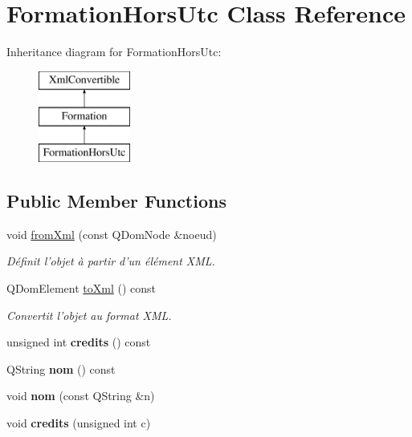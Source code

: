 \hypertarget{classFormationHorsUtc}{\section{Formation\+Hors\+Utc Class Reference}
\label{classFormationHorsUtc}
}
Inheritance diagram for Formation\+Hors\+Utc\+:\begin{figure}[H]
\begin{center}
\leavevmode
\includegraphics[height=3.000000cm]{classFormationHorsUtc}
\end{center}
\end{figure}
\subsection*{Public Member Functions}
\begin{DoxyCompactItemize}
\item 
\hypertarget{classFormationHorsUtc_a26f00d5dba28d91d3ea440cf3440bbaf}{void \hyperlink{classFormationHorsUtc_a26f00d5dba28d91d3ea440cf3440bbaf}{from\+Xml} (const Q\+Dom\+Node \&noeud)}\label{classFormationHorsUtc_a26f00d5dba28d91d3ea440cf3440bbaf}

\begin{DoxyCompactList}\small\item\em Définit l'objet à partir d'un élément X\+M\+L. \end{DoxyCompactList}\item 
Q\+Dom\+Element \hyperlink{classFormationHorsUtc_ab7f0cb9fcecf0423b257d1011e7d8623}{to\+Xml} () const 
\begin{DoxyCompactList}\small\item\em Convertit l'objet au format X\+M\+L. \end{DoxyCompactList}\item 
\hypertarget{classFormationHorsUtc_a8a62e27ab27a640f099b26eaebc2ebc0}{unsigned int {\bfseries credits} () const }\label{classFormationHorsUtc_a8a62e27ab27a640f099b26eaebc2ebc0}

\item 
\hypertarget{classFormationHorsUtc_ac59e7234fbe648389906940b6f67645f}{Q\+String {\bfseries nom} () const }\label{classFormationHorsUtc_ac59e7234fbe648389906940b6f67645f}

\item 
\hypertarget{classFormationHorsUtc_a7488a55025f57f319a1fab33ad1ea830}{void {\bfseries nom} (const Q\+String \&n)}\label{classFormationHorsUtc_a7488a55025f57f319a1fab33ad1ea830}

\item 
\hypertarget{classFormationHorsUtc_a9e6fba7076ad67ff52fc07579083cdcf}{void {\bfseries credits} (unsigned int c)}\label{classFormationHorsUtc_a9e6fba7076ad67ff52fc07579083cdcf}

\end{DoxyCompactItemize}
